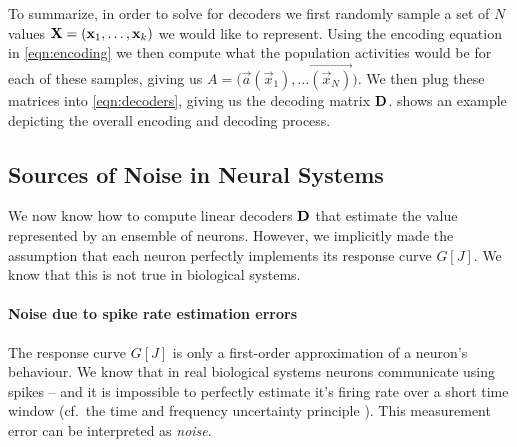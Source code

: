 \documentclass[10pt,letterpaper,oneside]{article}
\begin{document}
To summarize, in order to solve for decoders we first randomly sample a set of $N$ values ${\mathbf{X}} = ({{\mathbf{x}}}_1, \ldots, {{\mathbf{x}}}_k)$ we would like to represent. Using the encoding equation in \cref{eqn:encoding} we then compute what the population activities would be for each of these samples, giving us $A = \big(\vec a(\vec x_1), \ldots \vec{(\vec x_N)}\big)$. We then plug these matrices into \cref{eqn:decoders}, giving us the decoding matrix ${\mathbf{D}}$.  shows an example depicting the overall encoding and decoding process.



\cprotect{}

\subsection{Sources of Noise in Neural Systems}

We now know how to compute linear decoders ${\mathbf{D}}$ that estimate the value represented by an ensemble of neurons. However, we implicitly made the assumption that each neuron perfectly implements its response curve $G[J]$. We know that this is not true in biological systems.

\paragraph{Noise due to spike rate estimation errors}
The response curve $G[J]$ is only a first-order approximation of a neuron's behaviour. We know that in real biological systems neurons communicate using spikes -- and it is impossible to perfectly estimate it's firing rate over a short time window (cf.~the time and frequency uncertainty principle \cite{gabor1946theory}). This measurement error can be interpreted as \emph{noise}.
\end{document}
